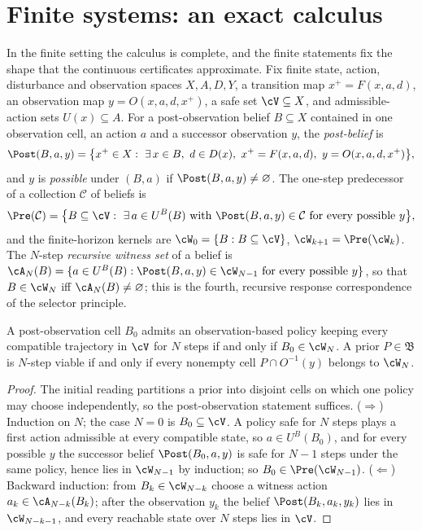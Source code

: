\section{Finite systems: an exact calculus}\label{sec:finite}

In the finite setting the calculus is complete, and the finite statements fix the shape that the continuous certificates approximate. Fix finite state, action, disturbance and observation spaces $X,A,D,Y$, a transition map $x^+=F(x,a,d)$, an observation map $y=O(x,a,d,x^+)$, a safe set $\cV\subseteq X$, and admissible-action sets $U(x)\subseteq A$. For a post-observation belief $B\subseteq X$ contained in one observation cell, an action $a$ and a successor observation $y$, the \emph{post-belief} is
\[
\Post(B,a,y)=\bigl\{x^+\in X:\ \exists\,x\in B,\ d\in D(x),\ x^+=F(x,a,d),\ y=O(x,a,d,x^+)\bigr\},
\]
and $y$ is \emph{possible} under $(B,a)$ if $\Post(B,a,y)\ne\varnothing$. The one-step predecessor of a collection $\mathcal C$ of beliefs is
\[
\Pre(\mathcal C)=\bigl\{B\subseteq\cV:\ \exists\,a\in U^B(B)\ \text{with}\ \Post(B,a,y)\in\mathcal C\ \text{for every possible }y\bigr\},
\]
and the finite-horizon kernels are $\cW_0=\{B:B\subseteq\cV\}$, $\cW_{k+1}=\Pre(\cW_k)$. The $N$-step \emph{recursive witness set} of a belief is $\cA_N(B)=\{a\in U^B(B):\Post(B,a,y)\in\cW_{N-1}\text{ for every possible }y\}$, so that $B\in\cW_N$ iff $\cA_N(B)\ne\varnothing$; this is the fourth, recursive response correspondence of the selector principle.

\begin{theorem}\label{thm:finite-horizon}
A post-observation cell $B_0$ admits an observation-based policy keeping every compatible trajectory in $\cV$ for $N$ steps if and only if $B_0\in\cW_N$. A prior $P\in\mathfrak B$ is $N$-step viable if and only if every nonempty cell $P\cap O^{-1}(y)$ belongs to $\cW_N$.
\end{theorem}

\begin{proof}
The initial reading partitions a prior into disjoint cells on which one policy may choose independently, so the post-observation statement suffices. ($\Rightarrow$) Induction on $N$; the case $N=0$ is $B_0\subseteq\cV$. A policy safe for $N$ steps plays a first action admissible at every compatible state, so $a\in U^B(B_0)$, and for every possible $y$ the successor belief $\Post(B_0,a,y)$ is safe for $N-1$ steps under the same policy, hence lies in $\cW_{N-1}$ by induction; so $B_0\in\Pre(\cW_{N-1})$. ($\Leftarrow$) Backward induction: from $B_k\in\cW_{N-k}$ choose a witness action $a_k\in\cA_{N-k}(B_k)$; after the observation $y_k$ the belief $\Post(B_k,a_k,y_k)$ lies in $\cW_{N-k-1}$, and every reachable state over $N$ steps lies in $\cV$.
\end{proof}

